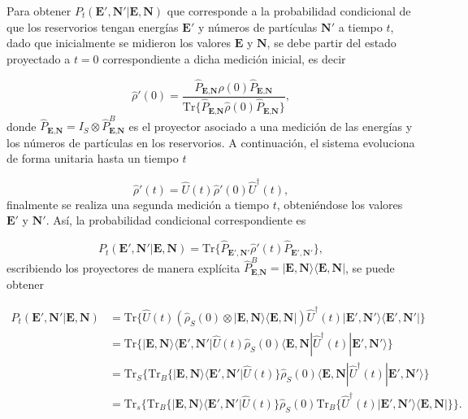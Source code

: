 Para obtener $P_{t}(\textbf{E}',\textbf{N}'|\textbf{E},\textbf{N})$ que corresponde a la probabilidad condicional de que los reservorios tengan energías $\textbf{E}'$ y números de partículas $\textbf{N}'$ a tiempo $t$, dado que inicialmente se midieron los valores $\textbf{E}$ y $\textbf{N}$, se debe partir del estado proyectado a $t=0$ correspondiente a dicha medición inicial, es decir

\begin{equation*}
    \hat{\rho}'(0) = \frac{\hat{P}_{\textbf{E}, \textbf{N} }\hat{\rho}(0) \hat{P}_{\textbf{E}, \textbf{N} } }{\text{Tr}\{\hat{P}_{\textbf{E}, \textbf{N} }\hat{\rho}(0) \hat{P}_{\textbf{E}, \textbf{N} } \} },
\end{equation*}
donde $\hat{P}_{\textbf{E}, \textbf{N} } = I_{S} \otimes \hat{P}^{B}_{\textbf{E}, \textbf{N} }$ es el proyector asociado a una medición de las energías y los números de partículas en los reservorios. A continuación, el sistema evoluciona de forma unitaria hasta un tiempo $t$

\begin{equation*}
    \hat{\rho}'(t) = \hat{U}(t)\hat{\rho}'(0)\hat{U}^{\dagger}(t),
\end{equation*}
finalmente se realiza una segunda medición a tiempo $t$, obteniéndose los valores $\textbf{E}'$ y $\textbf{N}'$. Así, la probabilidad condicional correspondiente es

\begin{equation*}
    P_{t}(\textbf{E}',\textbf{N}'|\textbf{E},\textbf{N}) = \text{Tr}\{\hat{P}_{\textbf{E}', \textbf{N}' }\hat{\rho}'(t) \hat{P}_{\textbf{E}', \textbf{N}' } \},
\end{equation*}
escribiendo los proyectores de manera explícita $\hat{P}^{B}_{\textbf{E}, \textbf{N} } = |\textbf{E}, \textbf{N} \rangle\langle \textbf{E}, \textbf{N}|$, se puede obtener 

\begin{align*} 
    P_{t}(\textbf{E}',\textbf{N}'|\textbf{E},\textbf{N}) & =  \text{Tr}\{\hat{U}(t)(\hat{\rho}_{S}(0)\otimes |\textbf{E}, \textbf{N}\rangle  \langle \textbf{E}, \textbf{N}| ) \hat{U}^{\dagger}(t)  |\textbf{E}', \textbf{N}'\rangle  \langle \textbf{E}', \textbf{N}'| \} \\
        & =  \text{Tr}\{|\textbf{E},\textbf{N} \rangle \langle \textbf{E}', \textbf{N}'| \hat{U}(t)\hat{\rho}_{S}(0) \langle \textbf{E}, \textbf{N}|\hat{U}^{\dagger}(t)|\textbf{E}', \textbf{N}'\rangle \}      \\ 
        & = \text{Tr}_{S}\{ \text{Tr}_{B}\{|\textbf{E},\textbf{N} \rangle \langle \textbf{E}', \textbf{N}'|\hat{U}(t) \}\hat{\rho}_{S}(0)\langle \textbf{E}, \textbf{N}|\hat{U}^{\dagger}(t)|\textbf{E}', \textbf{N}'\rangle      \} \\
        & = \text{Tr}_{s}\{ \text{Tr}_{B}\{|\textbf{E},\textbf{N}\rangle \langle \textbf{E}',\textbf{N}'|\hat{U}(t)  \} \hat{\rho}_{S}(0) \text{Tr}_{B}\{\hat{U}^{\dagger}(t) |\textbf{E}',\textbf{N}' \rangle \langle \textbf{E},\textbf{N}| \}     \}.
    \end{align*}    

